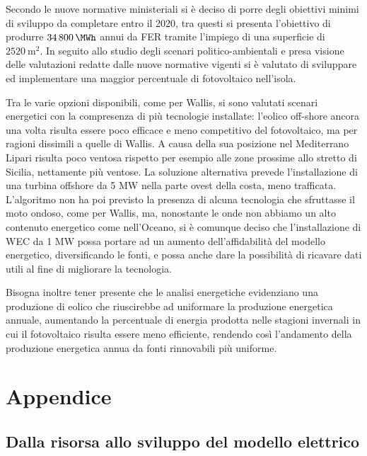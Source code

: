 \documentclass[fleqn,11pt]{SelfArx} %
\begin{document}
Secondo le nuove normative ministeriali si è deciso di porre degli obiettivi minimi di sviluppo da completare entro il 2020, tra questi si presenta l'obiettivo di produrre \(\SI{34800}{\MWh}\) annui da FER tramite l'impiego di una superficie di \(\SI{2520}{\metre\squared}\). In seguito allo studio degli scenari politico-ambientali e presa visione delle valutazioni redatte dalle nuove normative vigenti si è valutato di sviluppare ed implementare una maggior percentuale di fotovoltaico nell'isola.

Tra le varie opzioni disponibili, come per Wallis, si sono valutati scenari energetici con la compresenza di più tecnologie installate: l'eolico off-shore ancora una volta risulta essere poco efficace e meno competitivo del fotovoltaico, ma per ragioni dissimili a quelle di Wallis. A causa della sua posizione nel Mediterrano Lipari risulta poco ventosa rispetto per esempio alle zone prossime allo stretto di Sicilia, nettamente più ventose. La soluzione alternativa prevede l'installazione di una turbina offshore da 5 MW nella parte ovest della costa, meno trafficata. L'algoritmo non ha poi previsto la presenza di alcuna tecnologia che sfruttasse il moto ondoso, come per Wallis, ma, nonostante le onde non abbiamo un alto contenuto energetico come nell'Oceano, si è comunque deciso che l'installazione di WEC da 1 MW possa portare ad un aumento dell'affidabilità del modello energetico, diversificando le fonti, e possa anche dare la possibilità di ricavare dati utili al fine di migliorare la tecnologia. 

Bisogna inoltre tener presente che le analisi energetiche evidenziano una produzione di eolico che riuscirebbe ad uniformare la produzione energetica annuale, aumentando la percentuale di energia prodotta nelle stagioni invernali in cui il fotovoltaico risulta essere meno efficiente, rendendo così l'andamento della produzione energetica annua da fonti rinnovabili più uniforme.



\section{Appendice}

\subsection{Dalla risorsa allo sviluppo del modello elettrico}

\newcommand{\vcutin}{v_{\text{cut\_in}}}
\newcommand{\vcutout}{v_{\text{cut\_out}}}
\newcommand{\vrated}{v_{\text{rated}}}
\end{document}
